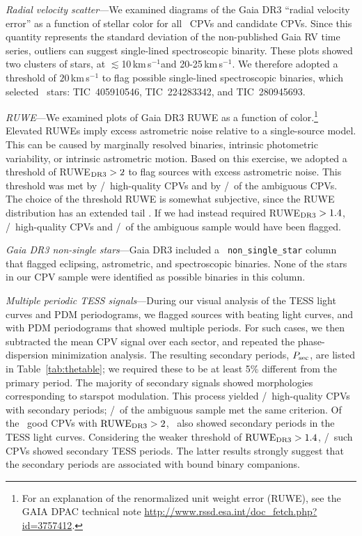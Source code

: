 \documentclass[11pt,twocolumn,tighten]{aastex63}
\newcommand{\kms}{{km\,s$^{-1}$}}
\begin{document}
{\it Radial velocity scatter}---We examined diagrams of the Gaia DR3
``radial velocity error'' as a function of stellar color for all
\ncqvsnodebunked\ CPVs and candidate CPVs.  Since this quantity
represents the standard deviation of the non-published Gaia RV time
series, outliers can suggest single-lined spectroscopic binarity.
These plots showed two clusters of stars, at $\lesssim$10\,\kms and
20-25\,\kms.  We therefore adopted a threshold of $20$\,km\,s$^{-1}$
to flag possible single-lined spectroscopic binaries, which selected
\nrvscatterflag\ stars: TIC~405910546, TIC~224283342, and
TIC~280945693.

{\it RUWE}---We examined plots of Gaia DR3 RUWE as a function of
color.\footnote{For an explanation of the renormalized unit weight
error (RUWE), see the GAIA DPAC technical note
\url{http://www.rssd.esa.int/doc_fetch.php?  id=3757412}.}  Elevated
RUWEs imply excess astrometric noise relative to a single-source
model.  This can be caused by marginally resolved binaries,  intrinsic
photometric variability, or intrinsic astrometric motion.  Based on
this exercise, we adopted a threshold of RUWE$_{\rm DR3}>2$ to flag
sources with excess astrometric noise.  This threshold was met by
\ngoodhighruwe/\ngoods\ high-quality CPVs and by
\nmaybehighruwe/\nmaybes\ of the ambiguous CPVs.  The choice of the
threshold RUWE is somewhat subjective, since the RUWE distribution has
an extended tail \citep[e.g.][]{2022MNRAS.513.5270P}.  If we had
instead required RUWE$_{\rm DR3}>1.4$, \ngoodweakruwe/\ngoods\
high-quality CPVs and \nmaybeweakruwe/\nmaybes\ of the ambiguous
sample would have been flagged.

{\it Gaia DR3 non-single stars}---Gaia DR3 included a {\tt
non\_single\_star} column that flagged eclipsing, astrometric, and
spectroscopic binaries.  None of the stars in our CPV sample were
identified as possible binaries in this column.

{\it Multiple periodic TESS signals}---During our visual analysis of
the TESS light curves and PDM periodograms, we flagged sources with
beating light curves, and with PDM periodograms that showed multiple
periods.  For such cases, we then subtracted the mean CPV signal over
each sector, and repeated the phase-dispersion minimization analysis.
The resulting secondary periods, $P_{\rm sec}$, are listed in
Table~\ref{tab:thetable}; we required these to be at least 5\%
different from the primary period.  The majority of secondary signals
showed morphologies corresponding to starspot modulation.  This
process yielded \ngoodmultperiodflag/\ngoods\ high-quality CPVs with
secondary periods; \nmaybemultperiodflag/\nmaybes\ of the ambiguous
sample met the same criterion.  Of the \ngoodhighruwe\ good CPVs with
${\rm RUWE}_{\rm DR3}> 2$, \ngoodruweandmultperiod\ also showed
secondary periods in the TESS light curves.  Considering the weaker
threshold of ${\rm RUWE}_{\rm DR3}> 1.4$,
\ngoodweakruweandmultperiod/\ngoodweakruwe\ such CPVs showed secondary
TESS periods.  The latter results strongly suggest that the secondary
periods are associated with bound binary companions.
\end{document}
